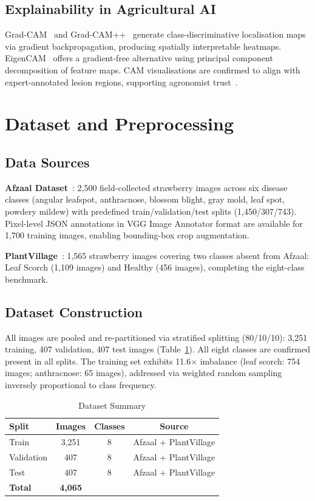 \documentclass[conference]{IEEEtran}
\begin{document}
\subsection{Explainability in Agricultural AI}
Grad-CAM~\cite{b16} and Grad-CAM++~\cite{b19} generate class-discriminative localisation maps via gradient backpropagation, producing spatially interpretable heatmaps. EigenCAM~\cite{b22} offers a gradient-free alternative using principal component decomposition of feature maps. CAM visualisations are confirmed to align with expert-annotated lesion regions, supporting agronomist trust~\cite{b17}.

\section{Dataset and Preprocessing}
\label{sec:dataset}

\subsection{Data Sources}
\textbf{Afzaal Dataset}~\cite{b6}: 2,500 field-collected strawberry images across six disease classes (angular leafspot, anthracnose, blossom blight, gray mold, leaf spot, powdery mildew) with predefined train/validation/test splits (1,450/307/743). Pixel-level JSON annotations in VGG Image Annotator format are available for 1,700 training images, enabling bounding-box crop augmentation.

\textbf{PlantVillage}~\cite{b3}: 1,565 strawberry images covering two classes absent from Afzaal: Leaf Scorch (1,109 images) and Healthy (456 images), completing the eight-class benchmark.

\subsection{Dataset Construction}
All images are pooled and re-partitioned via stratified splitting (80/10/10): 3,251 training, 407 validation, 407 test images (Table~\ref{tab:dataset}). All eight classes are confirmed present in all splits. The training set exhibits 11.6$\times$ imbalance (leaf scorch: 754 images; anthracnose: 65 images), addressed via weighted random sampling inversely proportional to class frequency.

\begin{table}[htbp]
\caption{Dataset Summary}
\begin{center}
\begin{tabular}{lccc}
\toprule
\textbf{Split} & \textbf{Images} & \textbf{Classes} & \textbf{Source} \\
\midrule
Train      & 3,251 & 8 & Afzaal + PlantVillage \\
Validation &   407 & 8 & Afzaal + PlantVillage \\
Test       &   407 & 8 & Afzaal + PlantVillage \\
\midrule
\textbf{Total} & \textbf{4,065} & & \\
\bottomrule
\end{tabular}
\label{tab:dataset}
\end{center}
\end{table}
\end{document}
